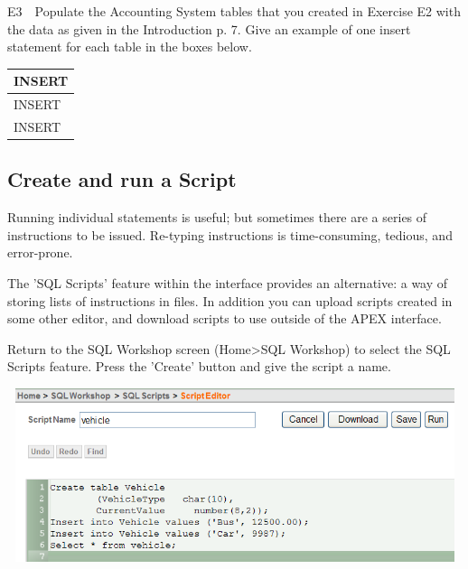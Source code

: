 E3\ \ Populate the Accounting System tables that you created in Exercise E2 with the data as given in the Introduction p. 7.  Give an example of one insert statement for each table in the boxes below.

\begin{flushleft}
\tablefirsthead{}
\tablehead{}
\tabletail{}
\tablelasttail{}
\begin{supertabular}{|m{14.663cm}|}
\hline
INSERT

\\\hline
INSERT

\\\hline
INSERT

\\\hline
\end{supertabular}
\end{flushleft}
\subsection{}
\subsection{Create and run a Script}
Running individual statements is useful; but sometimes there are a series of instructions to be issued. Re-typing instructions is time-consuming, tedious, and error-prone.

The 'SQL Scripts' feature within the interface provides an alternative: a way of storing lists of instructions in files.  In addition you can upload scripts created in some other editor, and download scripts to use outside of the APEX interface.

Return to the SQL Workshop screen (Home{\textgreater}SQL Workshop) to select the SQL Scripts feature. Press the 'Create' button and give the script a name.



\begin{center}
  
\includegraphics[width=14.727cm,height=5.068cm]{images/img (43).png}

\end{center}


